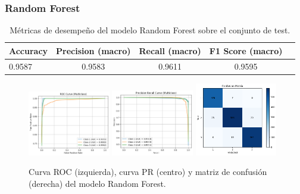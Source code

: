 \documentclass[11pt]{article}
\begin{document}
\subsubsection*{Random Forest}
\begin{table}[H]
    \centering
    \begin{tabular}{lcccc}
        \toprule
        \textbf{Accuracy} & \textbf{Precision (macro)} & \textbf{Recall (macro)} & \textbf{F1 Score (macro)} \\
        \midrule
        0.9587 & 0.9583 & 0.9611 & 0.9595 \\
        \bottomrule
    \end{tabular}
    \caption{Métricas de desempeño del modelo Random Forest sobre el conjunto de test.}
    \label{tab:rf_scores}
\end{table}

\begin{figure}[H]
    \centering
    \includegraphics[width=0.32\textwidth]{figures/rf_roc.png}
    \hfill
    \includegraphics[width=0.32\textwidth]{figures/rf_pr.png}
    \hfill
    \includegraphics[width=0.32\textwidth]{figures/rf_conf_matrix.png}
    \caption{Curva ROC (izquierda), curva PR (centro) y matriz de confusión (derecha) del modelo Random Forest.}
    \label{fig:rf_figures}
\end{figure}



\end{document}
